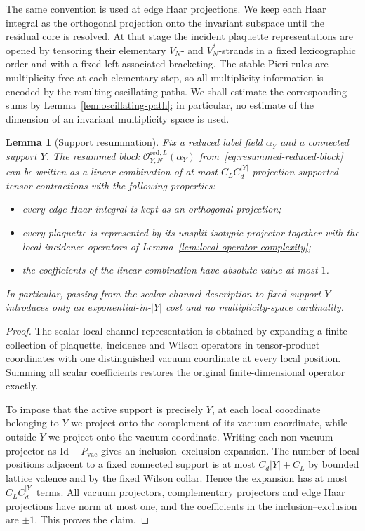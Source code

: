 \documentclass[11pt,a4paper,reqno]{amsart}
\newtheorem{lemma}[theorem]{Lemma}
\theoremstyle{definition}
\theoremstyle{remark}
\begin{document}
The same convention is used at edge Haar projections.  We keep each Haar integral as the orthogonal projection onto the invariant subspace until the residual core is resolved.  At that stage the incident plaquette representations are opened by tensoring their elementary $V_N$- and $V_N^*$-strands in a fixed lexicographic order and with a fixed left-associated bracketing.  The stable Pieri rules are multiplicity-free at each elementary step, so all multiplicity information is encoded by the resulting oscillating paths.  We shall estimate the corresponding sums by Lemma~\ref{lem:oscillating-path}; in particular, no estimate of the dimension of an invariant multiplicity space is used.


\begin{lemma}[Support resummation]\label{lem:support-resummation}
Fix a reduced label field $\alpha_Y$ and a connected support $Y$.  The resummed block
$\mathcal O_{Y,N}^{\mathrm{red},L}(\alpha_Y)$ from~\eqref{eq:resummed-reduced-block}
can be written as a linear combination of at most $C_LC_d^{|Y|}$ projection-supported tensor contractions with the following properties:
\begin{itemize}
\item every edge Haar integral is kept as an orthogonal projection;
\item every plaquette is represented by its unsplit isotypic projector together with the local incidence operators of Lemma~\ref{lem:local-operator-complexity};
\item the coefficients of the linear combination have absolute value at most $1$.
\end{itemize}
In particular, passing from the scalar-channel description to fixed support $Y$ introduces only an exponential-in-$|Y|$ cost and no multiplicity-space cardinality.
\end{lemma}

\begin{proof}
The scalar local-channel representation is obtained by expanding a finite collection of plaquette, incidence and Wilson operators in tensor-product coordinates with one distinguished vacuum coordinate at every local position.  Summing all scalar coefficients restores the original finite-dimensional operator exactly.

To impose that the active support is precisely $Y$, at each local coordinate belonging to $Y$ we project onto the complement of its vacuum coordinate, while outside $Y$ we project onto the vacuum coordinate.  Writing each non-vacuum projector as $\mathrm{Id}-P_{\mathrm{vac}}$ gives an inclusion--exclusion expansion.  The number of local positions adjacent to a fixed connected support is at most $C_d|Y|+C_L$ by bounded lattice valence and by the fixed Wilson collar.  Hence the expansion has at most $C_LC_d^{|Y|}$ terms.  All vacuum projectors, complementary projectors and edge Haar projections have norm at most one, and the coefficients in the inclusion--exclusion are $\pm1$.  This proves the claim.
\end{proof}
\end{document}
